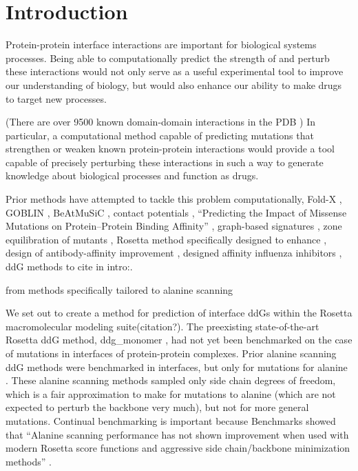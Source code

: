 \section{Introduction}

Protein-protein interface interactions are important for biological systems processes.
Being able to computationally predict the strength of and perturb these interactions would not only serve as a useful experimental tool to improve our understanding of biology, but would also enhance our ability to make drugs to target new processes.

(There are over 9500 known domain-domain interactions in the PDB \cite{finn_ipfam:_2014}) In particular, a computational method capable of predicting mutations that strengthen or weaken known protein-protein interactions would provide a tool capable of precisely perturbing these interactions in such a way to generate knowledge about biological processes and function as drugs.

Prior methods have attempted to tackle this problem computationally,
Fold-X \cite{guerois_predicting_2002},
GOBLIN \cite{kamisetty_accounting_2011},
BeAtMuSiC \cite{dehouck_beatmusic:_2013},
contact potentials \cite{moal_intermolecular_2013},
``Predicting the Impact of Missense Mutations on Protein–Protein Binding Affinity'' \cite{li_predicting_2014},
graph-based signatures \cite{pires_mcsm:_2014},
zone equilibration of mutants \cite{dourado_multiscale_2014},
Rosetta method specifically designed to enhance \cite{sammond_structure-based_2007},
design of antibody-affinity improvement \cite{lippow_computational_2007},
designed affinity influenza inhibitors \cite{whitehead_optimization_2012},
ddG methods to cite in intro:\cite{vangone_contacts-based_2015}.

from methods specifically tailored to alanine scanning

We set out to create a method for prediction of interface ddGs within the Rosetta macromolecular modeling suite(citation?). The preexisting state-of-the-art Rosetta ddG method,  ddg\_monomer \cite{kellogg_role_2011}, had not yet been benchmarked on the case of mutations in interfaces of protein-protein complexes. Prior alanine scanning ddG methods were benchmarked in interfaces, but only for mutations for alanine \cite{kortemme_simple_2002,kortemme_computational_2004,conchuir_web_2015}. These alanine scanning methods sampled only side chain degrees of freedom, which is a fair approximation to make for mutations to alanine (which are not expected to perturb the backbone very much), but not for more general mutations. Continual benchmarking is important because Benchmarks showed that ``Alanine scanning performance has not shown improvement when used with modern Rosetta score functions and aggressive side chain/backbone minimization methods'' \cite{conchuir_web_2015}.

